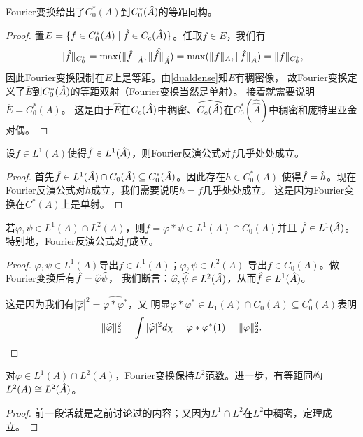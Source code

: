 \begin{proposition}
    Fourier变换给出了$C_0^*(A)$到$C_0^*(\hat{A})$的等距同构。
\end{proposition}
\begin{proof}
置$E = \{f \in C_0^*(A) \mid \hat{f} \in C_c(\hat{A})\}$。任取$f \in E$，我们有
\[\|\f\|_{C_0^*} = \max(\|\f\|_{\A},\|\ \hat{\!\!\f}\|_{\,\hat{\!\A}}) 
= \max(\|f\|_A,\|\f\|_{\A}) = \|f\|_{C_0^*},\]
因此Fourier变换限制在$E$上是等距。由\ref{dualdense}知$E$有稠密像，
故Fourier变换定义了$\overline{E}$到$C_0^*(\hat{A})$的等距双射（Fourier变换当然是单射）。
接着就需要说明$\overline{E} = C_0^*(A)$。
这是由于$\widehat{E}$在$C_c(\hat{A})$中稠密、$\widehat{C_c(\hat{A})}$在$C_0^*(\widehat{\widehat{A}})$中稠密和庞特里亚金对偶。
\end{proof}
\begin{theorem}[Fourier反演公式]
设$f \in L^1(A)$使得$\hat{f} \in L^1(\hat{A})$，则Fourier反演公式对$f$几乎处处成立。
\end{theorem}
\begin{proof}
    首先$\hat{f} \in L^1(\hat{A}) \cap C_0(\hat{A}) \subseteq C_0^*(\hat{A})$。因此存在$h \in C_0^*(A)$
    使得$\hat{f} = \hat{h}$。现在Fourier反演公式对$h$成立，我们需要说明$h = f$几乎处处成立。
    这是因为Fourier变换在$C^*(A)$上是单射。
\end{proof}
\begin{proposition}
    若$\varphi,\psi \in L^1(A) \cap L^2(A)$，则$f = \varphi*\psi \in L^1(A) \cap C_0(A)$并且
    $\hat{f} \in L^1(\hat{A})$。特别地，Fourier反演公式对$f$成立。
\end{proposition}
\begin{proof}
$\varphi,\psi \in L^1(A)$导出$f \in L^1(A)$；$\varphi,\psi \in L^2(A)$
导出$f \in C_0(A)$。做Fourier变换后有$\hat{f} = \widehat{\varphi}\widehat{\psi}$，
我们断言：$\widehat{\varphi},\widehat{\psi} \in L^2(\hat{A})$，从而$\hat{f} \in L^1(\hat{A})$。

这是因为我们有$|\widehat{\varphi}|^2 = \widehat{\varphi * \varphi^*}$，又
明显$\varphi * \varphi^* \in L_1(A) \cap C_0(A) \subseteq C_0^*(A)$表明
\[\|\widehat{\varphi}\|_2^2 = \int |\widehat{\varphi}|^2 d\chi 
= \varphi*\varphi^*(1) = \|\varphi\|_2^2.\qedhere\]
\end{proof}

\begin{theorem}[Plancherel公式]
对$\varphi \in L^1(A) \cap L^2(A)$，Fourier变换保持$L^2$范数。进一步，有等距同构
$L^2(A) \cong L^2(\hat{A})$。
\end{theorem}
\begin{proof}
    前一段话就是之前讨论过的内容；又因为$L^1 \cap L^2$在$L^2$中稠密，定理成立。
\end{proof}
